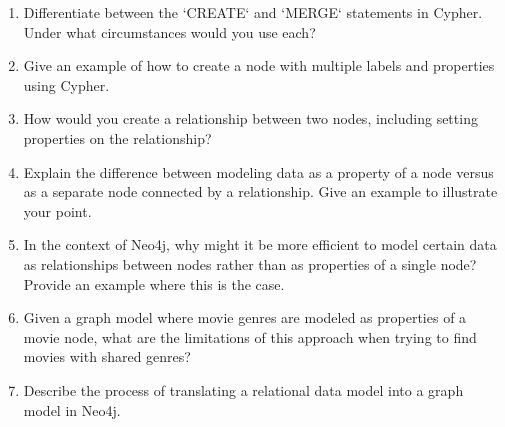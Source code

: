 \begin{enumerate}[nosep]
	\item Differentiate between the `CREATE` and `MERGE` statements in Cypher. Under what circumstances would you use each?
	\item Give an example of how to create a node with multiple labels and properties using Cypher.
	\item How would you create a relationship between two nodes, including setting properties on the relationship?
	\item Explain the difference between modeling data as a property of a node versus as a separate node connected by a relationship. Give an example to illustrate your point.
	\item In the context of Neo4j, why might it be more efficient to model certain data as relationships between nodes rather than as properties of a single node? Provide an example where this is the case.
	\item Given a graph model where movie genres are modeled as properties of a movie node, what are the limitations of this approach when trying to find movies with shared genres?
	\item Describe the process of translating a relational data model into a graph model in Neo4j.
\end{enumerate}



